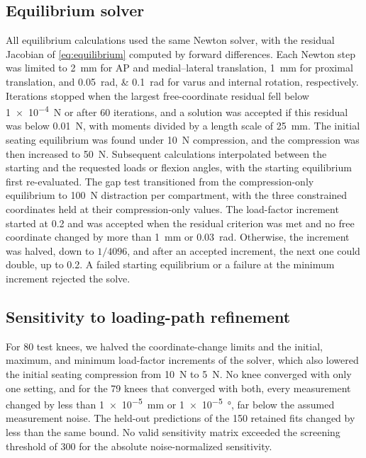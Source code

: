 \subsection*{Equilibrium solver}

All equilibrium calculations used the same Newton solver, with the residual Jacobian of \autoref{eq:equilibrium} computed by forward differences.
Each Newton step was limited to \SI{2}{\milli\meter} for AP and medial--lateral translation, \SI{1}{\milli\meter} for proximal translation, and \SIlist{0.05;0.1}{\radian} for varus and internal rotation, respectively.
Iterations stopped when the largest free-coordinate residual fell below \SI{1e-4}{\newton} or after 60 iterations, and a solution was accepted if this residual was below \SI{0.01}{\newton}, with moments divided by a length scale of \SI{25}{\milli\meter}.
The initial seating equilibrium was found under \SI{10}{\newton} compression, and the compression was then increased to \SI{50}{\newton}.
Subsequent calculations interpolated between the starting and the requested loads or flexion angles, with the starting equilibrium first re-evaluated.
The gap test transitioned from the compression-only equilibrium to \SI{100}{\newton} distraction per compartment, with the three constrained coordinates held at their compression-only values.
The load-factor increment started at 0.2 and was accepted when the residual criterion was met and no free coordinate changed by more than \SI{1}{\milli\meter} or \SI{0.03}{\radian}.
Otherwise, the increment was halved, down to $1/4096$, and after an accepted increment, the next one could double, up to 0.2.
A failed starting equilibrium or a failure at the minimum increment rejected the solve.

\subsection*{Sensitivity to loading-path refinement}

For 80 test knees, we halved the coordinate-change limits and the initial, maximum, and minimum load-factor increments of the solver, which also lowered the initial seating compression from \SI{10}{\newton} to \SI{5}{\newton}.
No knee converged with only one setting, and for the 79 knees that converged with both, every measurement changed by less than \SI{1e-5}{\milli\meter} or \SI{1e-5}{\degree}, far below the assumed measurement noise.
The held-out predictions of the 150 retained fits changed by less than the same bound.
No valid sensitivity matrix exceeded the screening threshold of 300 for the absolute noise-normalized sensitivity.

